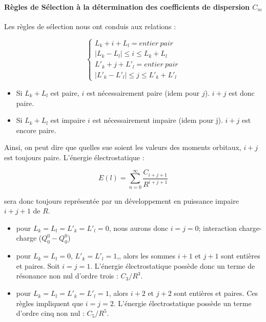 	\paragraph{Règles de Sélection à la détermination des coefficients de dispersion $C_{m}$}
	
	Les règles de sélection nous ont conduis aux relations :
	
	\begin{equation}
	\begin{cases}
	L_{k} + i + L_{l} = entier\ pair \\
	|L_{k} - L_{l}| \leq i \leq L_{k} + L_{l} \\
	L'_{k} + j + L'_{l} = entier\ pair \\
	|L'_{k} - L'_{l}| \leq j \leq L'_{k} + L'_{l}
	\end{cases}
	\end{equation}
	
	\begin{itemize}
		\item Si $L_{k} + L_{l}$ est paire, $i$ est nécessairement paire (idem pour $j$). $i + j$ est donc paire.	
		\item Si $L_{k} + L_{l}$ est impaire $i$ est nécessairement impaire (idem pour j). $i + j$ est encore paire.
	\end{itemize}
	
	Ainsi, on peut dire que quelles sue soient les valeurs des moments orbitaux, $i + j$ est toujours paire. L'énergie électrostatique : 
	
	\begin{equation}
	E(l) = \sum_{n=0}^{\infty} \frac{C_{i+j+1}}{R^{i+j+1}}
	\end{equation}
	
	sera donc toujours représentée par un développement en puissance impaire $i+ j + 1$ de $R$.
	
	\begin{itemize}
		\item pour $L_{k} = L_{l} = L'_{k} = L'_{l} = 0$, nous aurons donc $i = j = 0$; interaction charge-charge ($Q_{0}^{0}- Q_{0}^{0}$)	
		\item pour $L_{k} = L_{l} = 0$, $L'_{k} = L'_{l} = 1$,, alors les sommes $i + 1$ et $j + 1$ sont entières et paires. Soit $i = j = 1$. L'énergie électrostatique possède donc un terme de résonance non nul d'ordre trois : $C_{3}/R^{3}$.
		\item pour $L_{k} = L_{l} = L'_{k} = L'_{l} = 1$, alors $i + 2$ et $j + 2$ sont entières et paires. Ces règles impliquent que $i = j = 2$. L'énergie électrostatique possède un terme d'ordre cinq non nul : $C_{5}/R^{5}$.
	\end{itemize}
	
